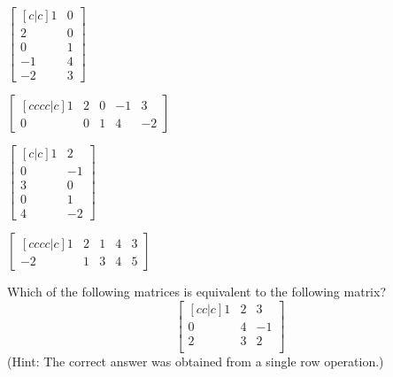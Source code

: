 \documentclass{article}
\begin{document}
\begin{readinessAssuranceTest}
\begin{multicols}{4}
\begin{readinessAssuranceTestChoices}
\item \(
      \begin{bmatrix}[c|c]
        1 & 0 \\
        2 & 0 \\
        0 & 1 \\
        -1 & 4 \\
        -2 & 3
      \end{bmatrix}
    \)
\item \(
      \begin{bmatrix}[cccc|c]
        1 & 2 & 0 & -1 & 3 \\
        0 & 0 & 1 & 4 & -2
      \end{bmatrix}
    \) %
    \item \(
          \begin{bmatrix}[c|c]
            1 & 2 \\
            0 & -1 \\
            3 & 0 \\
            0 & 1 \\
            4 & -2
          \end{bmatrix}
        \)
\item \(
      \begin{bmatrix}[cccc|c]
        1 & 2 & 1 & 4 & 3 \\
        -2 & 1 & 3 & 4 & 5
      \end{bmatrix}
    \)
\end{readinessAssuranceTestChoices}
\end{multicols}

\item Which of the following matrices is equivalent to the following matrix?
  \[
    \begin{bmatrix}[cc|c]
      1 & 2 & 3 \\
      0 & 4 & -1 \\
      2 & 3 & 2 \\
    \end{bmatrix}
  \]
  (Hint: The correct answer was obtained from a single row operation.)


\end{readinessAssuranceTest}
\end{document}
